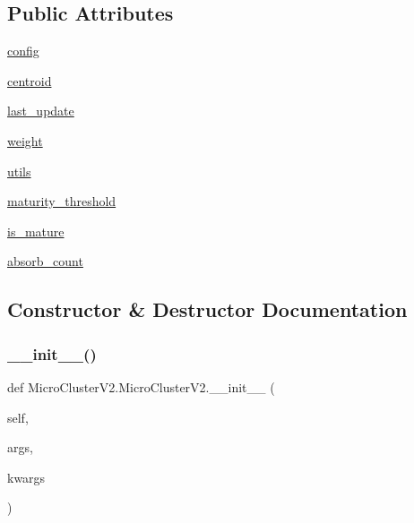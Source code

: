 \subsection*{Public Attributes}
\begin{DoxyCompactItemize}
\item 
\hyperlink{classMicroClusterV2_1_1MicroClusterV2_a912b0ecfaaef24a182078ab838448893}{config}
\item 
\hyperlink{classMicroClusterV2_1_1MicroClusterV2_a0fc66860929a6018f7c59207ca54b058}{centroid}
\item 
\hyperlink{classMicroClusterV2_1_1MicroClusterV2_a0a4b37397dd8c8a5684ac996206fd84b}{last\+\_\+update}
\item 
\hyperlink{classMicroClusterV2_1_1MicroClusterV2_a5373137259c548f4eb8b8ce8d7356a1a}{weight}
\item 
\hyperlink{classMicroClusterV2_1_1MicroClusterV2_aa62a6c665593edc3f72771a4c62910a5}{utils}
\item 
\hyperlink{classMicroClusterV2_1_1MicroClusterV2_aa389242a077663c5e9ab4d0fc439cd20}{maturity\+\_\+threshold}
\item 
\hyperlink{classMicroClusterV2_1_1MicroClusterV2_a122d10cdffad1e0e985c6eb48d985fb3}{is\+\_\+mature}
\item 
\hyperlink{classMicroClusterV2_1_1MicroClusterV2_a01c1fe83ef9635c86ba195ccd8c728c6}{absorb\+\_\+count}
\end{DoxyCompactItemize}


\subsection{Constructor \& Destructor Documentation}
\mbox{\label{classMicroClusterV2_1_1MicroClusterV2_a50559c863025ce8463d76b59adfd1aa8}} 
\subsubsection{\texorpdfstring{\+\_\+\+\_\+init\+\_\+\+\_\+()}{\_\_init\_\_()}}
{\footnotesize\ttfamily def Micro\+Cluster\+V2.\+Micro\+Cluster\+V2.\+\_\+\+\_\+init\+\_\+\+\_\+ (\begin{DoxyParamCaption}\item[{}]{self,  }\item[{}]{args,  }\item[{}]{kwargs }\end{DoxyParamCaption})}



